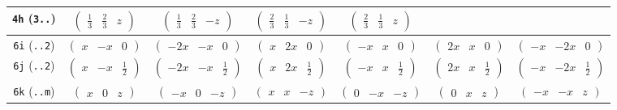 \documentclass[fleqn,9pt,landscape]{jsarticle}
\begin{document}
\begin{center}
\begin{longtable}{ccccccc}
{\tt 4h} ({\tt 3..}) & $ \begin{pmatrix} \frac{1}{3} & \frac{2}{3} & z \end{pmatrix} $ & $ \begin{pmatrix} \frac{1}{3} & \frac{2}{3} & - z \end{pmatrix} $ & $ \begin{pmatrix} \frac{2}{3} & \frac{1}{3} & - z \end{pmatrix} $ & $ \begin{pmatrix} \frac{2}{3} & \frac{1}{3} & z \end{pmatrix} $ & $  $ & $  $ \\ \hline
{\tt 6i} ({\tt ..2}) & $ \begin{pmatrix} x & - x & 0 \end{pmatrix} $ & $ \begin{pmatrix} - 2 x & - x & 0 \end{pmatrix} $ & $ \begin{pmatrix} x & 2 x & 0 \end{pmatrix} $ & $ \begin{pmatrix} - x & x & 0 \end{pmatrix} $ & $ \begin{pmatrix} 2 x & x & 0 \end{pmatrix} $ & $ \begin{pmatrix} - x & - 2 x & 0 \end{pmatrix} $ \\ \hline
{\tt 6j} ({\tt ..2}) & $ \begin{pmatrix} x & - x & \frac{1}{2} \end{pmatrix} $ & $ \begin{pmatrix} - 2 x & - x & \frac{1}{2} \end{pmatrix} $ & $ \begin{pmatrix} x & 2 x & \frac{1}{2} \end{pmatrix} $ & $ \begin{pmatrix} - x & x & \frac{1}{2} \end{pmatrix} $ & $ \begin{pmatrix} 2 x & x & \frac{1}{2} \end{pmatrix} $ & $ \begin{pmatrix} - x & - 2 x & \frac{1}{2} \end{pmatrix} $ \\ \hline
{\tt 6k} ({\tt ..m}) & $ \begin{pmatrix} x & 0 & z \end{pmatrix} $ & $ \begin{pmatrix} - x & 0 & - z \end{pmatrix} $ & $ \begin{pmatrix} x & x & - z \end{pmatrix} $ & $ \begin{pmatrix} 0 & - x & - z \end{pmatrix} $ & $ \begin{pmatrix} 0 & x & z \end{pmatrix} $ & $ \begin{pmatrix} - x & - x & z \end{pmatrix} $ \\ \hline

\end{longtable}
\end{center}
\end{document}
